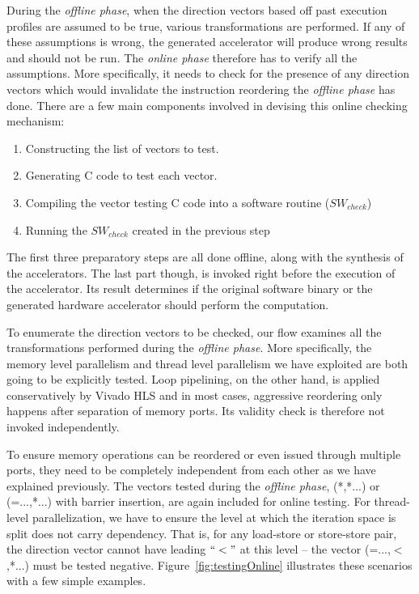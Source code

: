 During the \textit{offline phase}, when the direction vectors based off past execution profiles are assumed to be true, various transformations are performed. If any of these
assumptions is wrong, the generated accelerator will produce wrong results and should not be run. The \textit{online phase} therefore has to verify all the assumptions. More specifically, it needs to check for the presence of any direction vectors which would
invalidate the instruction reordering the \textit{offline phase} has done. 
There are a few main components involved in devising this online checking mechanism:
\begin{enumerate}
    \item Constructing the list of vectors to test.  
    \item Generating C code to test each vector. 
    \item Compiling the vector testing C code into a software routine ($SW_{check}$) %
    \item Running the $SW_{check}$ %
    created in the previous step
\end{enumerate}

The first three preparatory steps are all done offline,  along with the synthesis of the accelerators. The last part though, is invoked right before the execution of the
accelerator. Its result determines if the original software binary or the generated
hardware accelerator should perform the computation.

To enumerate the direction vectors to be checked, our flow examines all the transformations performed during the \textit{offline phase}. More specifically, the memory level parallelism and thread level parallelism we have exploited are both going to be explicitly tested. 
Loop pipelining, on the other hand, is
applied conservatively by Vivado HLS and in most cases, aggressive reordering only happens after separation of memory ports. Its validity check is therefore not invoked independently.  

To ensure memory operations can be reordered or even issued through multiple ports, they need to be completely independent from each other as we have explained previously. The vectors tested during the \textit{offline phase}, (*,*...) or (=...,*...) with barrier insertion, are again included for online testing. For thread-level parallelization,
we have to ensure the level at which the iteration space is split does not carry dependency. That is, for any load-store or store-store pair, the direction vector
cannot have leading $``<"$ at this level -- the vector (=...,$<$,*...) must be tested negative. Figure~\ref{fig:testingOnline} illustrates these scenarios with a few simple examples.


